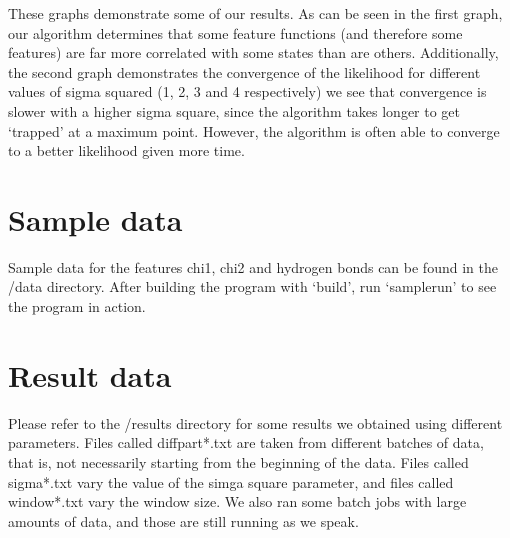 \documentclass[12pt, letterpaper]{article}
\begin{document}
        These graphs demonstrate some of our results. As can be seen in the first graph, our algorithm determines that some feature functions (and therefore some features) are far more correlated with some states than are others. Additionally, the second graph demonstrates the convergence of the likelihood for different values of sigma squared (1, 2, 3 and 4 respectively) we see that convergence is slower with a higher sigma square, since the algorithm takes longer to get `trapped' at a maximum point. However, the algorithm is often able to converge to a better likelihood given more time.

\section {Sample data}
Sample data for the features chi1, chi2 and hydrogen bonds can be found in the /data directory. After building the program with `build', run `sample\textunderscore run' to see the program in action.

\section {Result data}
Please refer to the /results directory for some results we obtained using different parameters. Files called diffpart*.txt are taken from different batches of data, that is, not necessarily starting from the beginning of the data. Files called sigma*.txt vary the value of the simga square parameter, and files called window*.txt vary the window size. We also ran some batch jobs with large amounts of data, and those are still running as we speak. 
\end{document}
